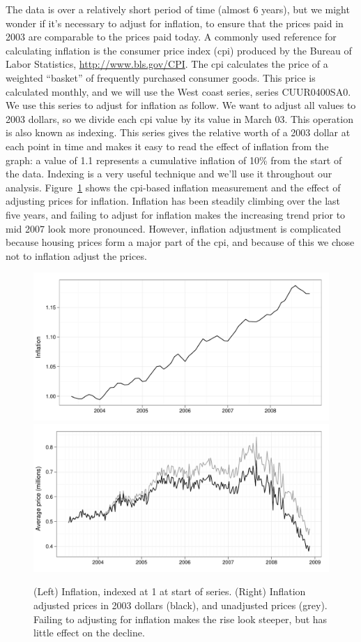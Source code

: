 \documentclass[oneside]{article}
\begin{document}
The data is over a relatively short period of time (almost 6 years), but we might wonder if it's necessary to adjust for inflation, to ensure that the prices paid in 2003 are comparable to the prices paid today.  A commonly used reference for calculating inflation is the consumer price index ({\sc cpi}) produced by the Bureau of Labor Statistics, \url{http://www.bls.gov/CPI}.  The {\sc cpi} calculates the price of a weighted ``basket'' of frequently purchased consumer goods.  This price is calculated monthly, and we will use the West coast series, series CUUR0400SA0.  We use this series to adjust for inflation as follow.  We want to adjust all values to 2003 dollars, so we divide each {\sc cpi} value by its value in March 03.  This operation is also known as indexing.  This series gives the relative worth of a 2003 dollar at each point in time and makes it easy to read the effect of inflation from the graph: a value of 1.1 represents a cumulative inflation of 10\% from the start of the data.  Indexing is a very useful technique and we'll use it throughout our analysis.  Figure~\ref{fig:inflation} shows the {\sc cpi}-based inflation measurement and the effect of adjusting prices for inflation.  Inflation has been steadily climbing over the last five years, and failing to adjust for inflation makes the increasing trend prior to mid 2007 look more pronounced.  However, inflation adjustment is complicated because housing prices form a major part of the {\sc cpi}, and because of this we chose not to inflation adjust the prices.

\begin{figure}[htbp]
  \centering
    \includegraphics[width=0.5 \linewidth]{daily-cpi}%
    \includegraphics[width=0.5 \linewidth]{daily-price-adj}
  \caption{(Left) Inflation, indexed at 1 at start of series.  (Right) Inflation adjusted prices in 2003 dollars (black), and unadjusted prices (grey).  Failing to adjusting for inflation makes the rise look steeper, but has little effect on the decline.}
  \label{fig:inflation}
\end{figure}
\end{document}
